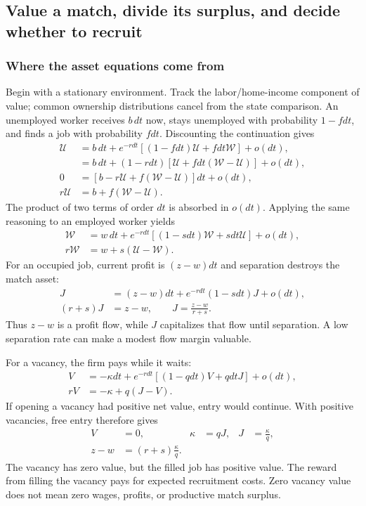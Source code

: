 \subsection{Value a match, divide its surplus, and decide whether to recruit}

\subsubsection{Where the asset equations come from}

Begin with a stationary environment. Track the labor/home-income component
of value; common ownership distributions cancel from the state comparison.
An unemployed worker receives $b\,dt$
now, stays unemployed with probability $1-fdt$, and finds a job with probability
$fdt$. Discounting the continuation gives
\begin{align}
 \mathcal U
 &=b\,dt+e^{-r dt}[(1-fdt)\mathcal U+fdt\mathcal W]+o(dt),\\
 &=b\,dt+(1-rdt)[\mathcal U+fdt(\mathcal W-\mathcal U)]+o(dt),\\
 0&=[b-r\mathcal U+f(\mathcal W-\mathcal U)]dt+o(dt),\\
 r\mathcal U&=b+f(\mathcal W-\mathcal U).
 \label{eq:lm-U-bellman}
\end{align}
The product of two terms of order $dt$ is absorbed in $o(dt)$. Applying the
same reasoning to an employed worker yields
\begin{align}
 \mathcal W
 &=w\,dt+e^{-rdt}[(1-sdt)\mathcal W+sdt\mathcal U]+o(dt),\\
 r\mathcal W&=w+s(\mathcal U-\mathcal W).
 \label{eq:lm-W-bellman}
\end{align}
For an occupied job, current profit is $(z-w)dt$ and separation destroys the
match asset:
\begin{align}
 J&=(z-w)dt+e^{-rdt}(1-sdt)J+o(dt),\\
 (r+s)J&=z-w,\qquad J=\frac{z-w}{r+s}.
 \label{eq:lm-job-value}
\end{align}
Thus $z-w$ is a profit flow, while $J$ capitalizes that flow until separation.
A low separation rate can make a modest flow margin valuable.

For a vacancy, the firm pays while it waits:
\begin{align}
 V&=-\kappa dt+e^{-rdt}[(1-qdt)V+qdt J]+o(dt),\\
 rV&=-\kappa+q(J-V).
\end{align}
If opening a vacancy had positive net value, entry would continue. With
positive vacancies, free entry therefore gives
\begin{align}
 V&=0, & \kappa&=qJ, & J&=\frac\kappa q,\\
 z-w&=(r+s)\frac\kappa q.
 \label{eq:lm-job-creation}
\end{align}
The vacancy has zero value, but the filled job has positive value. The reward
from filling the vacancy pays for expected recruitment costs. Zero vacancy
value does not mean zero wages, profits, or productive match surplus.

